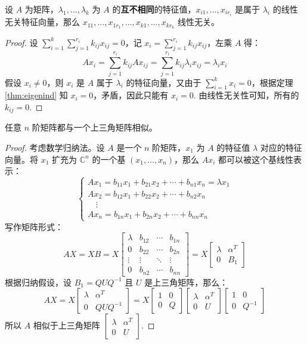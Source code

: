 \begin{theorem}[特征向量的线性无关性-续]
设 $A$ 为矩阵，$\lambda_1,\ldots,\lambda_k$ 为 $A$ 的\textbf{互不相同}的特征值，$x_{i1},\ldots,x_{ir_i}$ 是属于 $\lambda_i$ 的线性无关特征向量，那么 $x_{11},\ldots,x_{1r_1},\ldots,x_{k1},\ldots,x_{kr_k}$ 线性无关。
\end{theorem}
\begin{proof}
设 $\sum_{i=1}^k\sum_{j=1}^{r_i}k_{ij}x_{ij}=0$，记 $x_i=\sum_{j=1}^{r_i}k_{ij}x_{ij}$，左乘 $A$ 得：
\[
    Ax_i=\sum_{j=1}^{r_i}k_{ij}Ax_{ij}=\sum_{j=1}^{r_i}k_{ij}\lambda_ix_{ij}=\lambda_ix_i
\]
假设 $x_i\neq0$，则 $x_i$ 是 $A$ 属于 $\lambda_i$ 的特征向量，又由于 $\sum_{i=1}^kx_i=0$，根据定理 \ref{thm:eigenind} 知 $x_i=0$，矛盾，因此只能有 $x_i=0$. 由线性无关性可知，所有的 $k_{ij}=0$.
\end{proof}

\begin{theorem}
\label{thm:anysimilar}
任意 $n$ 阶矩阵都与一个上三角矩阵相似。
\end{theorem}
\begin{proof}
考虑数学归纳法。设 $A$ 是一个 $n$ 阶矩阵，$x_1$ 为 $A$ 的特征值 $\lambda$ 对应的特征向量。将 $x_1$ 扩充为 $\mathbb C^n$ 的一个基 $(x_1,\ldots,x_n)$，那么 $Ax_i$ 都可以被这个基线性表示：
\[
\begin{cases}
Ax_1=b_{11}x_1+b_{21}x_2+\cdots+b_{n1}x_n=\lambda x_1\\
Ax_2=b_{12}x_1+b_{22}x_2+\cdots+b_{n2}x_n\\
\quad\vdots\\
Ax_n=b_{1n}x_1+b_{2n}x_2+\cdots+b_{nn}x_n
\end{cases}
\]
写作矩阵形式：
\[
AX=XB=X\begin{bmatrix}\lambda&b_{12}&\cdots&b_{1n}\\0&b_{22}&\cdots&b_{2n}\\\vdots&\vdots&\ddots&\vdots\\0&b_{n2}&\cdots&b_{nn}\end{bmatrix}=X\begin{bmatrix}\lambda&\alpha^T\\0&B_1\end{bmatrix}
\]
根据归纳假设，设 $B_1=QUQ^{-1}$ 且 $U$ 是上三角矩阵，那么：
\[
AX=X\begin{bmatrix}\lambda&\alpha^T\\0&QUQ^{-1}\end{bmatrix}=X\begin{bmatrix}1&0\\0&Q\end{bmatrix}\begin{bmatrix}\lambda&\alpha^T\\0&U\end{bmatrix}\begin{bmatrix}1&0\\0&Q^{-1}\end{bmatrix}
\]
所以 $A$ 相似于上三角矩阵 $\begin{bmatrix}\lambda&\alpha^T\\0&U\end{bmatrix}$.
\end{proof}

